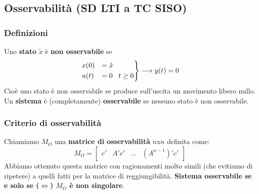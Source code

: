 \subsection{Osservabilità (SD LTI a TC SISO)}
\subsubsection{Definizioni}
Uno \textbf{stato} $\tilde{x}$ è \textbf{non osservabile} se 
\[
    \begin{rcases}
        x(0) &= \tilde{x}\\
        u(t) &= 0 \;\;\;t \geq 0
    \end{rcases} \longrightarrow y(t) = 0
\]
Cioè uno stato è non osservabile se produce sull'uscita un movimento libero nullo.\newline
\newline
Un \textbf{sistema} è (completamente) \textbf{osservabile} se nessuno stato è non osservabile.
\subsubsection{Criterio di osservabilità}
Chiamiamo $M_O$ una \textbf{matrice di osservabilità} $n$x$n$ definita come:
\[
    M_O = \left[\begin{matrix}
        c' & A'c' & \dots & (A^{n-1})' c'
    \end{matrix}\right]
\]
Abbiamo ottenuto questa matrice con ragionamenti molto simili (che evitiamo di ripetere) a quelli fatti per la matrice di reggiungibilità.\newline
\newline
\textbf{Sistema osservabile se e solo se ($\Leftrightarrow$) $M_O$ è non singolare}.
